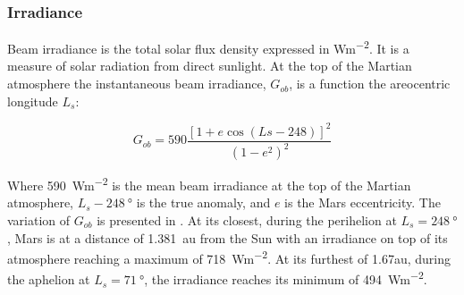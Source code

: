 \subsubsection{Irradiance}
\label{sec:MartianEnvironment:SolarRadiation:Irradiance}

Beam irradiance is the total solar flux density expressed in \si{Wm^{-2}}. It is a measure of solar radiation from direct sunlight. At the top of the Martian atmosphere the instantaneous beam irradiance, $G_{ob}$, is a function the areocentric longitude $L_{s}$:

\begin{equation}
  \label{eq:G_ob}
  G_{ob} = 590 \frac{[1 + e \cos{(Ls - 248)}]^2}{(1-e^2)^2}
\end{equation}

Where \SI{590}{Wm^{-2}} is the mean beam irradiance at the top of the Martian atmosphere, $L_{s} - \SI{248}{\degree}$ is the true anomaly, and $e$ is the Mars eccentricity. The variation of $G_{ob}$ is presented in . At its closest, during the perihelion at $L_{s} = \SI{248}{\degree}$, Mars is at a distance of \SI{1.381}{\astronomicalunit} from the Sun with an irradiance on top of its atmosphere reaching a maximum of \SI{718}{Wm^{-2}}. At its furthest of 1.67\si{\astronomicalunit}, during the aphelion at $L_{s} = \SI{71}{\degree}$, the irradiance reaches its minimum of \SI{494}{Wm^{-2}}.

